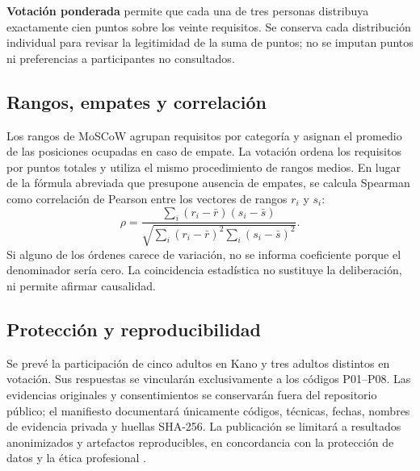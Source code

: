 \textbf{Votación ponderada} permite que cada una de tres personas distribuya exactamente cien puntos sobre los veinte requisitos. Se conserva cada distribución individual para revisar la legitimidad de la suma de puntos; no se imputan puntos ni preferencias a participantes no consultados.

\subsection{Rangos, empates y correlación}
Los rangos de MoSCoW agrupan requisitos por categoría y asignan el promedio de las posiciones ocupadas en caso de empate. La votación ordena los requisitos por puntos totales y utiliza el mismo procedimiento de rangos medios. En lugar de la fórmula abreviada que presupone ausencia de empates, se calcula Spearman como correlación de Pearson entre los vectores de rangos \(r_i\) y \(s_i\):
\begin{equation}
\rho=\frac{\sum_i(r_i-\bar r)(s_i-\bar s)}{\sqrt{\sum_i(r_i-\bar r)^2\sum_i(s_i-\bar s)^2}}.
\label{eq:spearman}
\end{equation}
Si alguno de los órdenes carece de variación, no se informa coeficiente porque el denominador sería cero. La coincidencia estadística no sustituye la deliberación, ni permite afirmar causalidad.

\subsection{Protección y reproducibilidad}
Se prevé la participación de cinco adultos en Kano y tres adultos distintos en votación. Sus respuestas se vincularán exclusivamente a los códigos P01--P08. Las evidencias originales y consentimientos se conservarán fuera del repositorio público; el manifiesto documentará únicamente códigos, técnicas, fechas, nombres de evidencia privada y huellas SHA-256. La publicación se limitará a resultados anonimizados y artefactos reproducibles, en concordancia con la protección de datos y la ética profesional \cite{lopdp2021,acm2018}.
